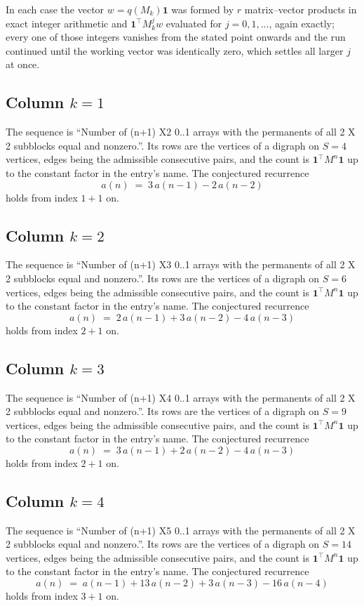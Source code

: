 \documentclass[11pt,a4paper]{article}
\theoremstyle{plain}
\theoremstyle{definition}
\begin{document}
In each case the vector $w=q(M_k)\mathbf{1}$ was formed by $r$ matrix--vector products in
exact integer arithmetic and $\mathbf{1}^{\!\top}M_k^{j}w$ evaluated for $j=0,1,\dots$,
again exactly; every one of those integers vanishes from the stated point onwards and the run
continued until the working vector was identically zero, which settles all larger $j$ at once.

\subsection*{Column $k$$=1$}
The sequence is ``Number of (n+1) X2 0..1 arrays with the permanents of all 2 X 2 subblocks equal and nonzero.''. Its rows are the vertices of a digraph on
$S=4$ vertices, edges being the admissible consecutive pairs, and the count is
$\mathbf{1}^{\!\top}M^{n}\mathbf{1}$ up to the constant factor in the entry's name.
The conjectured recurrence
\[
a(n)\;=\;3\,a(n-1) - 2\,a(n-2)
\]
holds from index $1+1$ on.

\subsection*{Column $k$$=2$}
The sequence is ``Number of (n+1) X3 0..1 arrays with the permanents of all 2 X 2 subblocks equal and nonzero.''. Its rows are the vertices of a digraph on
$S=6$ vertices, edges being the admissible consecutive pairs, and the count is
$\mathbf{1}^{\!\top}M^{n}\mathbf{1}$ up to the constant factor in the entry's name.
The conjectured recurrence
\[
a(n)\;=\;2\,a(n-1) + 3\,a(n-2) - 4\,a(n-3)
\]
holds from index $2+1$ on.

\subsection*{Column $k$$=3$}
The sequence is ``Number of (n+1) X4 0..1 arrays with the permanents of all 2 X 2 subblocks equal and nonzero.''. Its rows are the vertices of a digraph on
$S=9$ vertices, edges being the admissible consecutive pairs, and the count is
$\mathbf{1}^{\!\top}M^{n}\mathbf{1}$ up to the constant factor in the entry's name.
The conjectured recurrence
\[
a(n)\;=\;3\,a(n-1) + 2\,a(n-2) - 4\,a(n-3)
\]
holds from index $2+1$ on.

\subsection*{Column $k$$=4$}
The sequence is ``Number of (n+1) X5 0..1 arrays with the permanents of all 2 X 2 subblocks equal and nonzero.''. Its rows are the vertices of a digraph on
$S=14$ vertices, edges being the admissible consecutive pairs, and the count is
$\mathbf{1}^{\!\top}M^{n}\mathbf{1}$ up to the constant factor in the entry's name.
The conjectured recurrence
\[
a(n)\;=\;a(n-1) + 13\,a(n-2) + 3\,a(n-3) - 16\,a(n-4)
\]
holds from index $3+1$ on.
\end{document}
